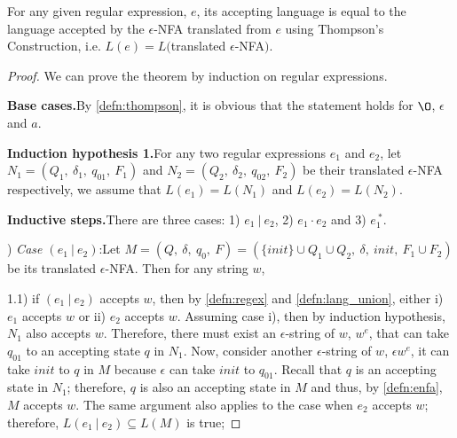 \begin{thm} 
\noindent For any given regular expression, \(e\), its accepting
language is equal to the language accepted by the \(\epsilon\)-NFA
translated from \(e\) using Thompson's Construction, i.e. \(L(e) =
L(\)translated \(\epsilon\)-NFA\()\). 
\end{thm} 

\begin{proof}
\noindent We can prove the theorem by induction on regular
expressions. 

\par \noindent \textbf{Base cases.}\quad By \autoref{defn:thompson}, it is
obvious that the statement holds for \(\O\), \(\epsilon\) and
\(a\). 

\par \noindent \textbf{Induction hypothesis 1.}\quad For any two regular expressions
\(e_1\) and \(e_2\), let \(N_1 =
(Q_1,\ \delta_1,\ q_{01},\ F_1)\) and \(N_2 = (Q_2,\ \delta_2,\
q_{02},\ F_2)\) be their translated \(\epsilon\)-NFA 
respectively, we assume that \(L(e_1) = L(N_1)\) and \(L(e_2) =
L(N_2)\). 

\par \noindent \textbf{Inductive steps.}\quad There are three cases: 1)
\(e_1\ |\ e_2\), 2) \(e_1 \cdot e_2\) and 3) \(e_1^{\ *}\). 

\par {}) \textit{Case \((e_1\ |\ e_2)\)}:\quad Let \(M = (Q,\ \delta,\ q_0,\ F) = (\{init\} \cup Q_1 \cup Q_2,\
\delta,\ init,\ F_1 \cup F_2)\) be its translated \(\epsilon\)-NFA. Then for any string \(w\), 

\par 1.1) if \((e_1\ |\ e_2)\) accepts \(w\), then by
\autoref{defn:regex} and \autoref{defn:lang_union},
either i) \(e_1\) accepts \(w\) or ii) \(e_2\) accepts \(w\). Assuming case i), then by
induction hypothesis, \(N_1\) also accepts \(w\). Therefore, there
must exist an \(\epsilon\)-string of \(w\), \(w^e\), that can take \(q_{01}\)
to an accepting state \(q\) in \(N_1\). Now, consider another
\(\epsilon\)-string of \(w\), \(\epsilon w^e\), it can
take \(init\) to \(q\) in \(M\) because \(\epsilon\) can take \(init\)
to \(q_{01}\). Recall that \(q\) is an accepting
state in \(N_1\); therefore, \(q\) is also an accepting state in
\(M\) and thus, by \autoref{defn:enfa}, \(M\) accepts \(w\). The same argument also applies
to the case when \(e_2\) accepts \(w\); therefore, \(L(e_1\ |\ e_2) \subseteq L(M)\) is true; 


\end{proof}
